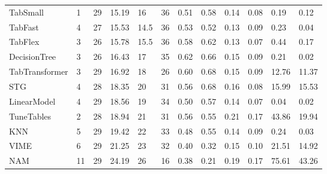 \begin{tabular}{lllllrllllll}
TabSmall & 1 & 29 & 15.19 & 16 & 36 & 0.51 & 0.58 & 0.14 & 0.08 & 0.19 & 0.12 \\
TabFast & 4 & 27 & 15.53 & 14.5 & 36 & 0.53 & 0.52 & 0.13 & 0.09 & 0.23 & 0.04 \\
TabFlex & 3 & 26 & 15.78 & 15.5 & 36 & 0.58 & 0.62 & 0.13 & 0.07 & 0.44 & 0.17 \\
DecisionTree & 3 & 26 & 16.43 & 17 & 35 & 0.62 & 0.66 & 0.15 & 0.09 & 0.21 & 0.02 \\
TabTransformer & 3 & 29 & 16.92 & 18 & 26 & 0.60 & 0.68 & 0.15 & 0.09 & 12.76 & 11.37 \\
STG & 4 & 28 & 18.35 & 20 & 31 & 0.56 & 0.68 & 0.16 & 0.08 & 15.99 & 15.53 \\
LinearModel & 4 & 29 & 18.56 & 19 & 34 & 0.50 & 0.57 & 0.14 & 0.07 & 0.04 & 0.02 \\
TuneTables & 2 & 28 & 18.94 & 21 & 31 & 0.56 & 0.55 & 0.21 & 0.17 & 43.86 & 19.94 \\
KNN & 5 & 29 & 19.42 & 22 & 33 & 0.48 & 0.55 & 0.14 & 0.09 & 0.24 & 0.03 \\
VIME & 6 & 29 & 21.25 & 23 & 32 & 0.40 & 0.32 & 0.15 & 0.10 & 21.51 & 14.92 \\
NAM & 11 & 29 & 24.19 & 26 & 16 & 0.38 & 0.21 & 0.19 & 0.17 & 75.61 & 43.26 \\
\bottomrule
\end{tabular}
